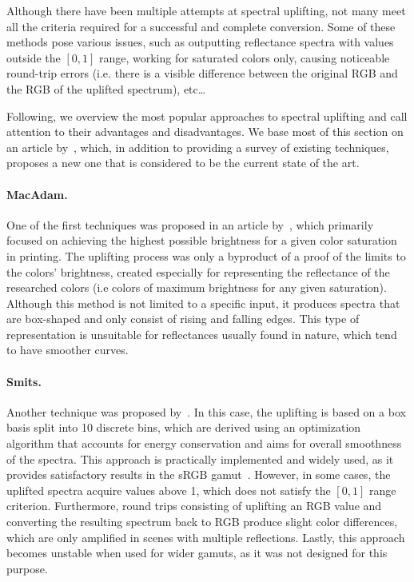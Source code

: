 Although there have been multiple attempts at spectral uplifting, not many meet all the criteria required for a successful and complete conversion. Some of these methods pose various issues, such as outputting reflectance spectra with values outside the $[0,1]$ range, working for saturated colors only, causing noticeable round-trip errors (i.e. there is a visible difference between the original RGB and the RGB of the uplifted spectrum), etc\ldots

Following, we overview the most popular approaches to spectral uplifting and call attention to their advantages and disadvantages. We base most of this section on an article by~\citet{upsamplingFluorescence}, which, in addition to providing a survey of existing techniques, proposes a new one that is considered to be the current state of the art.

\paragraph{MacAdam.} One of the first techniques was proposed in an article by~\citet{upsamplingMacAdam}, which primarily focused on achieving the highest possible brightness for a given color saturation in printing. The uplifting process was only a byproduct of a proof of the limits to the colors' brightness, created especially for representing the reflectance of the researched colors (i.e colors of maximum brightness for any given saturation). Although this method is not limited to a specific input, it produces spectra that are box-shaped and only consist of rising and falling edges. This type of representation is unsuitable for reflectances usually found in nature, which tend to have smoother curves.

\paragraph{Smits.} Another technique was proposed by~\citet{upsamplingSmits}. In this case, the uplifting is based on a box basis split into 10 discrete bins, which are derived using an optimization algorithm that accounts for energy conservation and aims for overall smoothness of the spectra. This approach is practically implemented and widely used, as it provides satisfactory results in the sRGB gamut~\cite{upsamplingJakobHanika}. However, in some cases, the uplifted spectra acquire values above 1, which does not satisfy the $[0,1]$ range criterion. Furthermore, round trips consisting of uplifting an RGB value and converting the resulting spectrum back to RGB produce slight color differences, which are only amplified in scenes with multiple reflections. Lastly, this approach becomes unstable when used for wider gamuts, as it was not designed for this purpose.

